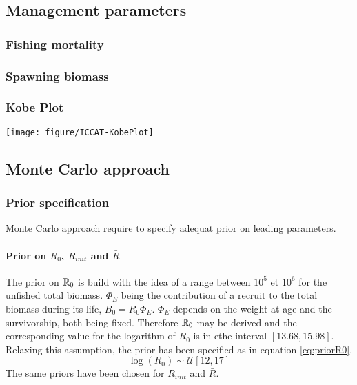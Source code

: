 
\subsection{Management parameters}
\subsubsection{Fishing mortality}





\subsubsection{Spawning biomass}




\subsubsection{Kobe Plot}

{\centering \texttt{[image: figure/ICCAT-KobePlot]} 
}










\subsection{Monte Carlo approach}
\subsubsection{Prior specification}
Monte Carlo approach require to specify adequat prior on leading parameters.
\paragraph{Prior on $R_0$, $R_{init}$ and $\bar{R}$}
The prior on $\mathbb{R}_0$ is build with the idea of a range between $10^5$ et $10^6$ for the unfished total biomass. $\Phi_E$ being the contribution of a recruit to the total biomass during its life, 
$B_0=R_0\Phi_E$. $\Phi_E$ depends on the weight at age and the survivorship, both being fixed. Therefore $\mathbb{R}_0$ may be derived and the corresponding value for the logarithm of $R_0$ is in ethe interval $[13.68, 15.98]$. Relaxing this assumption, 
the prior has been specified as in equation \ref{eq:priorR0}.
\begin{equation}
\log(R_0) \sim \mathcal{U}[12, 17] 
\label{eq:priorR0}
\end{equation}
The same priors have been chosen for $R_{init}$ and $\bar{R}$. 


